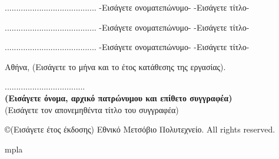 \documentclass[12pt, twoside, a4paper]{report}
\begin{document}
\begin{center}
\scriptsize
\parbox[b]{0.3\textwidth} {\center
	........................................
	-Εισάγετε ονοματεπώνυμο-
	-Εισάγετε τίτλο-
}
\parbox[b]{0.3\textwidth} {\center
	........................................
	-Εισάγετε ονοματεπώνυμο-
	-Εισάγετε τίτλο-
}
\parbox[b]{0.3\textwidth} {\center
	........................................
	-Εισάγετε ονοματεπώνυμο-
	-Εισάγετε τίτλο-
}
\end{center}
\vspace{10ex}
\normalsize
\noindent
Αθήνα, (Εισάγετε το μήνα και το έτος κατάθεσης της εργασίας).
\newpage
\thispagestyle{empty}
\hspace{10pt}

\vspace{30ex}
\noindent
................................... \\
\textbf{(Εισάγετε όνομα, αρχικό πατρώνυμου και επίθετο συγγραφέα)} \\
(Εισάγετε τον απονεμηθέντα τίτλο του συγγραφέα) \\
\vspace{8ex}


\small
\noindent
\copyright \hspace{1em}(Εισάγετε έτος έκδοσης) Εθνικό Μετσόβιο Πολυτεχνείο.
All rights reserved.



\newpage
\thispagestyle{empty}
\mbox{}
\newpage

\setcounter{page}{1}
\tableofcontents
\newpage
\listoffigures











mpla ~\cite{gao2017containerleaks}


{}
\end{document}
